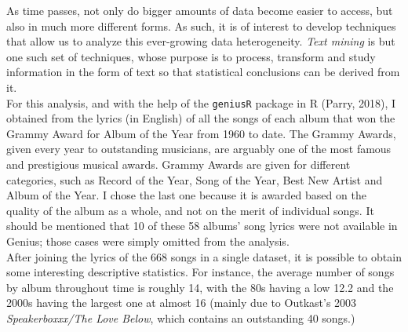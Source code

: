 \documentclass{article}
\begin{document}
As time passes, not only do bigger amounts of data become easier to access, but also in much more different forms. As such, it is of interest to develop techniques that allow us to analyze this ever-growing data heterogeneity. \textit{Text mining} is but one such set of techniques, whose purpose is to process, transform and study information in the form of text so that statistical conclusions can be derived from it. \\


For this analysis, and with the help of the \texttt{geniusR} package in \textsf{R} (Parry, 2018), I obtained from \href{https://genius.com/}{} the lyrics (in English) of all the songs of each album that won the Grammy Award for Album of the Year from 1960 to date. The Grammy Awards, given every year to outstanding musicians, are arguably one of the most famous and prestigious musical awards. Grammy Awards are given for different categories, such as Record of the Year, Song of the Year, Best New Artist and Album of the Year. I chose the last one because it is awarded based on the quality of the album as a whole, and not on the merit of individual songs. It should be mentioned that 10 of these 58 albums' song lyrics were not available in Genius; those cases were simply omitted from the analysis. \\








After joining the lyrics of the 668 songs in a single dataset, it is possible to obtain some interesting descriptive statistics. For instance, the average number of songs by album throughout time is roughly 14, with the 80s having a low 12.2 and the 2000s having the largest one at almost 16 (mainly due to Outkast's 2003 \textit{Speakerboxxx/The Love Below}, which contains an outstanding 40 songs.) \\
\end{document}
